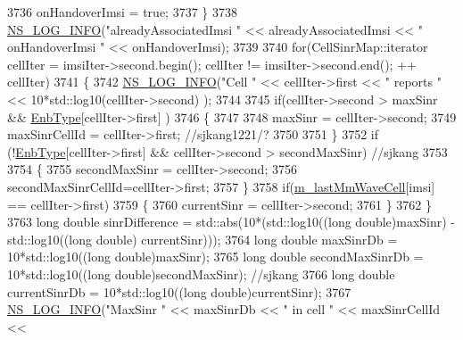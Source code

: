 \begin{DoxyCode}
3736         onHandoverImsi = \textcolor{keyword}{true};
3737       \}
3738       \hyperlink{group__logging_gafbd73ee2cf9f26b319f49086d8e860fb}{NS\_LOG\_INFO}(\textcolor{stringliteral}{"alreadyAssociatedImsi "} << alreadyAssociatedImsi << \textcolor{stringliteral}{" onHandoverImsi "} << 
      onHandoverImsi);
3739 
3740       \textcolor{keywordflow}{for}(CellSinrMap::iterator cellIter = imsiIter->second.begin(); cellIter != imsiIter->second.end(); ++
      cellIter)
3741       \{
3742         \hyperlink{group__logging_gafbd73ee2cf9f26b319f49086d8e860fb}{NS\_LOG\_INFO}(\textcolor{stringliteral}{"Cell "} << cellIter->first << \textcolor{stringliteral}{" reports "} << 10*std::log10(cellIter->second)
      );
3744 
3745         \textcolor{keywordflow}{if}(cellIter->second > maxSinr && \hyperlink{classns3_1_1LteEnbRrc_acaae2a0038e440cc53930beb11753cd9}{EnbType}[cellIter->first] )
3746         \{
3747 
3748                 maxSinr = cellIter->second;
3749           maxSinrCellId = cellIter->first; \textcolor{comment}{//sjkang1221/?}
3750 
3751            \} 
3752         \textcolor{keywordflow}{if} (!\hyperlink{classns3_1_1LteEnbRrc_acaae2a0038e440cc53930beb11753cd9}{EnbType}[cellIter->first] && cellIter->second > secondMaxSinr) \textcolor{comment}{//sjkang}
3753 
3754         \{
3755                 secondMaxSinr = cellIter->second;
3756                 secondMaxSinrCellId=cellIter->first;
3757          \}
3758         \textcolor{keywordflow}{if}(\hyperlink{classns3_1_1LteEnbRrc_a0d7b04f0383b0dc3f6a7360b87cbaeee}{m\_lastMmWaveCell}[imsi] == cellIter->first)
3759         \{
3760           currentSinr = cellIter->second;
3761         \}
3762       \}
3763       \textcolor{keywordtype}{long} \textcolor{keywordtype}{double} sinrDifference = std::abs(10*(std::log10((\textcolor{keywordtype}{long} \textcolor{keywordtype}{double})maxSinr) - std::log10((\textcolor{keywordtype}{long} \textcolor{keywordtype}{double})
      currentSinr)));
3764       \textcolor{keywordtype}{long} \textcolor{keywordtype}{double} maxSinrDb = 10*std::log10((\textcolor{keywordtype}{long} \textcolor{keywordtype}{double})maxSinr);
3765       \textcolor{keywordtype}{long} \textcolor{keywordtype}{double} secondMaxSinrDb = 10*std::log10((\textcolor{keywordtype}{long} \textcolor{keywordtype}{double})secondMaxSinr); \textcolor{comment}{//sjkang}
3766       \textcolor{keywordtype}{long} \textcolor{keywordtype}{double} currentSinrDb = 10*std::log10((\textcolor{keywordtype}{long} \textcolor{keywordtype}{double})currentSinr);
3767       \hyperlink{group__logging_gafbd73ee2cf9f26b319f49086d8e860fb}{NS\_LOG\_INFO}(\textcolor{stringliteral}{"MaxSinr "} << maxSinrDb << \textcolor{stringliteral}{" in cell "} << maxSinrCellId << 

\end{DoxyCode}
